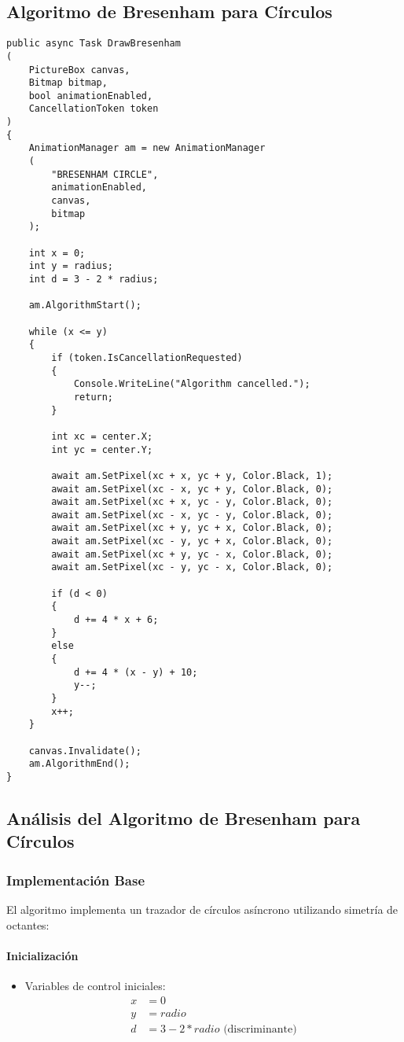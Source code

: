 \documentclass[12pt]{article}
\begin{document}
\subsection{Algoritmo de Bresenham para Círculos}
\begin{lstlisting}
public async Task DrawBresenham
(
    PictureBox canvas,
    Bitmap bitmap,
    bool animationEnabled,
    CancellationToken token
)
{
    AnimationManager am = new AnimationManager
    (
        "BRESENHAM CIRCLE",
        animationEnabled,
        canvas,
        bitmap
    );

    int x = 0;
    int y = radius;
    int d = 3 - 2 * radius;

    am.AlgorithmStart();

    while (x <= y)
    {
        if (token.IsCancellationRequested)
        {
            Console.WriteLine("Algorithm cancelled.");
            return;
        }

        int xc = center.X;
        int yc = center.Y;

        await am.SetPixel(xc + x, yc + y, Color.Black, 1);
        await am.SetPixel(xc - x, yc + y, Color.Black, 0);
        await am.SetPixel(xc + x, yc - y, Color.Black, 0);
        await am.SetPixel(xc - x, yc - y, Color.Black, 0);
        await am.SetPixel(xc + y, yc + x, Color.Black, 0);
        await am.SetPixel(xc - y, yc + x, Color.Black, 0);
        await am.SetPixel(xc + y, yc - x, Color.Black, 0);
        await am.SetPixel(xc - y, yc - x, Color.Black, 0);

        if (d < 0)
        {
            d += 4 * x + 6;
        }
        else
        {
            d += 4 * (x - y) + 10;
            y--;
        }
        x++;
    }

    canvas.Invalidate();
    am.AlgorithmEnd();
}
\end{lstlisting}

\subsection{Análisis del Algoritmo de Bresenham para Círculos}

\subsubsection{Implementación Base}
El algoritmo implementa un trazador de círculos asíncrono utilizando simetría de octantes:

\paragraph{Inicialización}
\begin{itemize}
    \item Variables de control iniciales:
        \begin{align*}
            x &= 0 \\
            y &= radio \\
            d &= 3 - 2 * radio \text{ (discriminante)}
        \end{align*}
\end{itemize}
\end{document}
